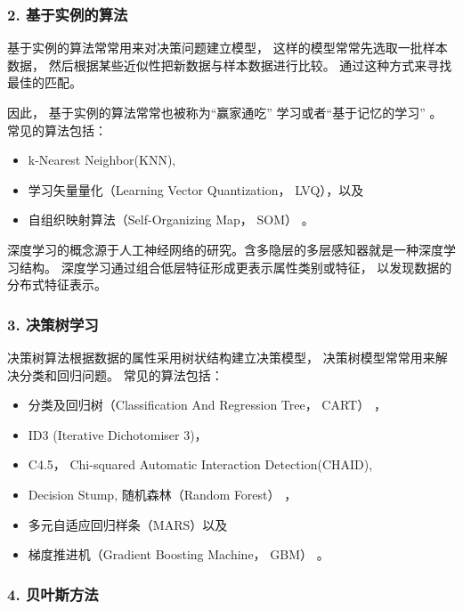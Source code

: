 \documentclass[
]{article}
\begin{document}
\hypertarget{2-ux57faux4e8eux5b9eux4f8bux7684ux7b97ux6cd5}{%
\subsubsection{2.
基于实例的算法}\label{2-ux57faux4e8eux5b9eux4f8bux7684ux7b97ux6cd5}}

基于实例的算法常常用来对决策问题建立模型，
这样的模型常常先选取一批样本数据，
然后根据某些近似性把新数据与样本数据进行比较。
通过这种方式来寻找最佳的匹配。

因此， 基于实例的算法常常也被称为``赢家通吃'' 学习或者``基于记忆的学习''
。 常见的算法包括：

\begin{itemize}
\item
  k-Nearest Neighbor(KNN),
\item
  学习矢量量化（Learning Vector Quantization， LVQ），以及
\item
  自组织映射算法（Self-Organizing Map， SOM） 。
\end{itemize}

深度学习的概念源于人工神经网络的研究。含多隐层的多层感知器就是一种深度学习结构。
深度学习通过组合低层特征形成更表示属性类别或特征，
以发现数据的分布式特征表示。

\hypertarget{3-ux51b3ux7b56ux6811ux5b66ux4e60}{%
\subsubsection{3. 决策树学习}\label{3-ux51b3ux7b56ux6811ux5b66ux4e60}}

决策树算法根据数据的属性采用树状结构建立决策模型，
决策树模型常常用来解决分类和回归问题。 常见的算法包括：

\begin{itemize}
\item
  分类及回归树（Classification And Regression Tree， CART） ，
\item
  ID3 (Iterative Dichotomiser 3)，
\item
  C4.5， Chi-squared Automatic Interaction Detection(CHAID),
\item
  Decision Stump, 随机森林（Random Forest） ，
\item
  多元自适应回归样条（MARS）以及
\item
  梯度推进机（Gradient Boosting Machine， GBM） 。
\end{itemize}

\hypertarget{4-ux8d1dux53f6ux65afux65b9ux6cd5}{%
\subsubsection{4. 贝叶斯方法}\label{4-ux8d1dux53f6ux65afux65b9ux6cd5}}
\end{document}
